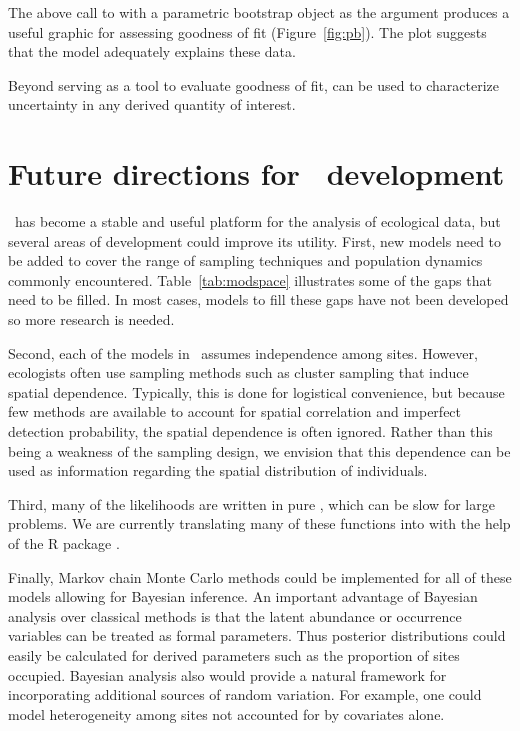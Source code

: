 \documentclass[article,shortnames]{jss}
\newcommand{\um}{\pkg{unmarked}}
\newcommand{\rlang}{\proglang{R}}
\begin{document}
{The above call to  with a parametric bootstrap object as
the argument produces a useful graphic for assessing goodness of fit
(Figure~\ref{fig:pb}).  The plot suggests that the model adequately
explains these data.

Beyond serving as a tool to evaluate goodness of fit,
 can be used to characterize uncertainty in any derived quantity
of interest.


\section[Future directions for unmarked development]{Future directions for \um\ development}
\label{sec:future-direct-unmark}

\um\ has become a stable and useful platform for the analysis of ecological
data, but several areas of development could improve its utility.  First, new
models need to be added to cover the range of sampling techniques and
population dynamics commonly encountered. Table~\ref{tab:modspace} illustrates
some of the gaps that need to be filled. In most cases, models to fill these
gaps have not been developed so more research is needed.


Second, each of the models in \um\ assumes independence among sites. However,
ecologists often use sampling methods such as cluster sampling that induce
spatial dependence. Typically, this is done for logistical convenience, but
because few methods are available to account for spatial correlation and
imperfect detection probability, the spatial dependence is often ignored.
Rather than this being a weakness of the sampling design, we envision that
this dependence can be used as information regarding the spatial distribution
of individuals.

Third, many of the likelihoods are written in pure \rlang, which can be
slow for large problems. We are currently translating many of these
functions into  with the help of the R package 
\citep{Rcpp11}.

Finally, Markov chain Monte Carlo methods could be implemented for all
of these models allowing for Bayesian inference.  An
important advantage of Bayesian analysis over classical methods is that the
latent abundance or occurrence variables can be treated as formal parameters.
Thus posterior distributions could easily be calculated for derived parameters
such as the proportion of sites occupied.  Bayesian analysis also would provide
a natural framework for incorporating additional sources of random variation.
For example, one could model heterogeneity among sites not accounted for by
covariates alone.

}
\end{document}

